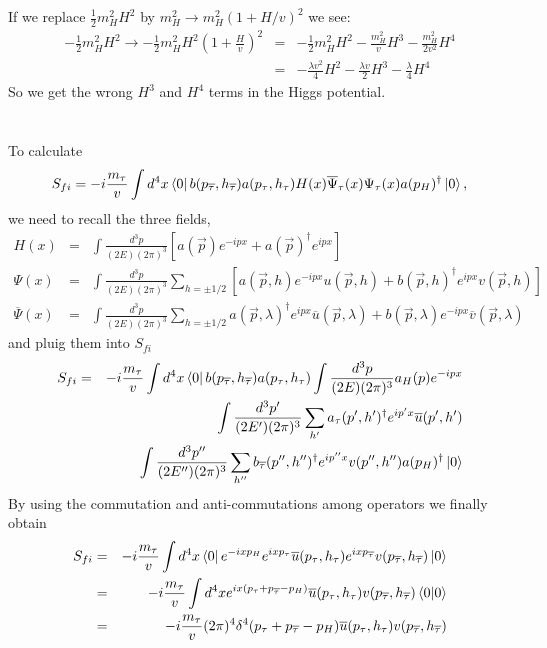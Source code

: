 \documentclass[11pt]{article}
\def\dgr{\dagger}
\begin{document}
If we replace $\frac{1}{2} m_H^2 H^2$ by $m_H^2 \rightarrow m_H^2(1+H/v)^2$ we see:
\begin{eqnarray}
    -\frac{1}{2} m_H^2 H^2  \to -\frac{1}{2} m_H^2 H^2 (1+\frac{H}{v})^2 &=& -\frac{1}{2} m_H^2 H^2 - \frac{m_H^2}{v} H^3 - \frac{m_H^2}{2v^2} H^4 \\
    & =& -\frac{\lambda v^2}{4} H^2 - \frac{\lambda v}{2} H^3 - \frac{\lambda}{4} H^4
\end{eqnarray}
So we get the wrong $H^3$ and $H^4$ terms in the Higgs potential.


\section{ }
To calculate
\begin{eqnarray}
  S_{fi}= -i\frac{m_\tau}{v} \int d^4 x
  \bra{0} b(p_{\overline \tau},h_{\overline \tau}) a(p_\tau,h_\tau)
      H(x) {\overline \Psi}_\tau(x) \Psi_\tau(x) a(p_H)^\dgr \ket{0} ,
\end{eqnarray}
we need to recall the three fields,
\begin{eqnarray}
  H(x)  &=& \int \frac{d^3p}{(2E)(2\pi)^3} [ a({\vec p}) e^{-ipx} + a(\vec p)^\dgr e^{ipx} ]  \\
\Psi(x)  &=& \int \frac{d^3p}{(2E)(2\pi)^3}
  \sum_{h=\pm1/2} [a({\vec p},h)     e^{-ipx} u({\vec p},h)
  + b({\vec p},h)^\dgr e^{ipx}  v({\vec p},h)]  \\ 
{\overline \Psi}(x) &=& \int \frac{d^3p}{(2E)(2\pi)^3} \sum_{h=\pm1/2}
  { a({\vec p},\lambda)^\dgr e^{ipx}  {\overline u}({\vec p},\lambda)
  + b({\vec p},\lambda)      e^{-ipx} {\overline v}({\vec p},\lambda) }
\end{eqnarray}
and pluig them into $S_{fi}$
\begin{eqnarray}
  S_{fi} &=& -i\frac{m_\tau}{v} \int d^4 x
  \bra{0} b(p_{\overline \tau},h_{\overline \tau}) a(p_\tau,h_\tau)
  \int \frac{d^3p}{(2E)(2\pi)^3} a_H(p) e^{-ipx}
  \nonumber \\&&\int \frac{d^3p'}{(2E')(2\pi)^3} \sum_{h'}
      a_\tau(p',h')^\dgr e^{ip'x}  {\overline u}(p',h')
      \nonumber \\&& \int \frac{d^3p{''}}{(2E{''})(2\pi)^3} \sum_{h{''}}
      b_{\overline \tau}(p{''},h{''})^\dgr e^{ip{''}x} v(p{''},h{''})
  a(p_H)^\dgr \ket{0} 
\end{eqnarray}
By using the commutation and anti-commutations among operators we finally obtain
\begin{eqnarray}
  S_{fi}
  &=& -i\frac{m_\tau}{v} \int d^4 x
  \bra{0} e^{-ix p_H}
      e^{ ix p_\tau} {\overline u}(p_\tau,h_\tau)
      e^{ ix p_{\overline \tau}} v(p_{\overline \tau},h_{\overline \tau}) \ket{0} \\
      &=&-i\frac{m_\tau}{v} \int d^4 x
      e^{ix(p_\tau+p_{\overline \tau}-p_H)}
      {\overline u}(p_\tau,h_\tau) v(p_{\overline \tau},h_{\overline \tau})  \bra{0}\ket{0} \\
      &=& -i\frac{m_\tau}{v} (2\pi)^4 \delta^4( p_\tau+p_{\overline \tau}-p_H )
      {\overline u}(p_\tau,h_\tau) v(p_{\overline \tau},h_{\overline \tau}) 
\end{eqnarray}
\end{document}
